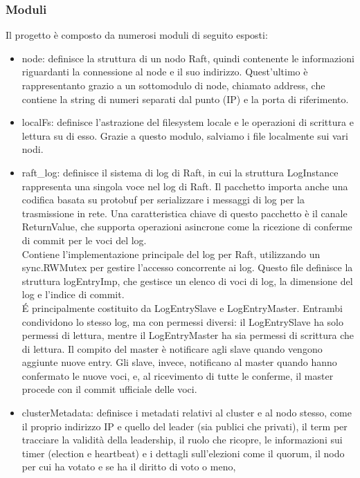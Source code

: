 \subsubsection{Moduli}
Il progetto è composto da numerosi moduli di seguito esposti:
\begin{itemize}
  \item node: definisce la struttura di un nodo Raft, quindi contenente le informazioni riguardanti la connessione al node e il suo indirizzo. Quest'ultimo è rappresentanto grazio a un sottomodulo di node, chiamato address, 
    che contiene la string di numeri separati dal punto (IP) e la porta di riferimento.

  \item localFs: definisce l'astrazione del filesystem locale e le operazioni di scrittura e lettura su di esso. Grazie a questo modulo, salviamo i file localmente sui vari nodi.
 
  \item raft\_log: definisce il sistema di log di Raft, in cui la struttura LogInstance rappresenta una singola voce nel log di Raft. Il pacchetto importa anche una codifica basata su protobuf per serializzare i messaggi 
    di log per la trasmissione in rete. Una caratteristica chiave di questo pacchetto è il canale ReturnValue, che supporta operazioni asincrone come la ricezione di conferme di commit per le voci del log. \\
    Contiene l'implementazione principale del log per Raft, utilizzando un sync.RWMutex per gestire l'accesso concorrente ai log. Questo file definisce la struttura logEntryImp, che gestisce un elenco di voci di log, la 
    dimensione del log e l'indice di commit. \\
    \'E principalmente costituito da LogEntrySlave e LogEntryMaster. Entrambi condividono lo stesso log, ma con permessi diversi: il LogEntrySlave ha solo permessi di lettura, mentre il LogEntryMaster ha sia permessi di scrittura 
    che di lettura. Il compito del master è notificare agli slave quando vengono aggiunte nuove entry. Gli slave, invece, notificano al master quando hanno confermato le nuove voci, e, al ricevimento di tutte le conferme, 
    il master procede con il commit ufficiale delle voci.
  
  \item clusterMetadata: definisce i metadati relativi al cluster e al nodo stesso, come il proprio indirizzo IP e quello del leader (sia publici che privati), il term per tracciare la validità della leadership, il ruolo 
    che ricopre, le informazioni sui timer (election e heartbeat) e i dettagli 
    sull'elezioni come il quorum, il nodo per cui ha votato e se ha il diritto di voto o meno, 


\end{itemize}
